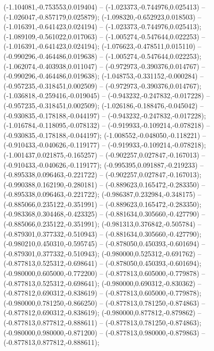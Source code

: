  (-1.104081,-0.753553,0.019404) -- (-1.023373,-0.744976,0.025413) -- (-1.026047,-0.857179,0.025879);
 (-1.098320,-0.652923,0.018503) -- (-1.016391,-0.641423,0.024194) -- (-1.023373,-0.744976,0.025413);
 (-1.089109,-0.561022,0.017063) -- (-1.005274,-0.547644,0.022253) -- (-1.016391,-0.641423,0.024194);
 (-1.076623,-0.478511,0.015110) -- (-0.990296,-0.464486,0.019638) -- (-1.005274,-0.547644,0.022253);
 (-1.062074,-0.403938,0.011047) -- (-0.972973,-0.390376,0.014767) -- (-0.990296,-0.464486,0.019638);
 (-1.048753,-0.331152,-0.000284) -- (-0.957235,-0.318451,0.002509) -- (-0.972973,-0.390376,0.014767);
 (-1.036818,-0.259416,-0.019045) -- (-0.943232,-0.247832,-0.017228) -- (-0.957235,-0.318451,0.002509);
 (-1.026186,-0.188476,-0.045042) -- (-0.930835,-0.178188,-0.044197) -- (-0.943232,-0.247832,-0.017228);
 (-1.016784,-0.118095,-0.078132) -- (-0.919933,-0.109214,-0.078218) -- (-0.930835,-0.178188,-0.044197);
 (-1.008552,-0.048050,-0.118221) -- (-0.910433,-0.040626,-0.119177) -- (-0.919933,-0.109214,-0.078218);
 (-1.001437,0.021875,-0.165257) -- (-0.902257,0.027847,-0.167013) -- (-0.910433,-0.040626,-0.119177);
 (-0.995395,0.091887,-0.219233) -- (-0.895338,0.096463,-0.221722) -- (-0.902257,0.027847,-0.167013);
 (-0.990388,0.162190,-0.280181) -- (-0.889623,0.165472,-0.283350) -- (-0.895338,0.096463,-0.221722);
 (-0.986387,0.232984,-0.348175) -- (-0.885066,0.235122,-0.351991) -- (-0.889623,0.165472,-0.283350);
 (-0.983368,0.304468,-0.423325) -- (-0.881634,0.305660,-0.427790) -- (-0.885066,0.235122,-0.351991);
 (-0.981313,0.376842,-0.505784) -- (-0.879301,0.377332,-0.510943) -- (-0.881634,0.305660,-0.427790);
 (-0.980210,0.450310,-0.595745) -- (-0.878050,0.450393,-0.601694) -- (-0.879301,0.377332,-0.510943);
 (-0.980000,0.525312,-0.691762) -- (-0.877813,0.525312,-0.698641) -- (-0.878050,0.450393,-0.601694);
 (-0.980000,0.605000,-0.772200) -- (-0.877813,0.605000,-0.779878) -- (-0.877813,0.525312,-0.698641);
 (-0.980000,0.690312,-0.830362) -- (-0.877812,0.690312,-0.838619) -- (-0.877813,0.605000,-0.779878);
 (-0.980000,0.781250,-0.866250) -- (-0.877813,0.781250,-0.874863) -- (-0.877812,0.690312,-0.838619);
 (-0.980000,0.877812,-0.879862) -- (-0.877813,0.877812,-0.888611) -- (-0.877813,0.781250,-0.874863);
 (-0.980000,0.980000,-0.871200) -- (-0.877813,0.980000,-0.879863) -- (-0.877813,0.877812,-0.888611);
